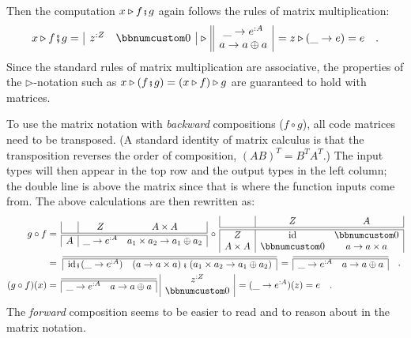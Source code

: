 Then the computation $x\triangleright f\bef g$ again follows the
rules of matrix multiplication:
\[
x\triangleright f\bef g=\,\begin{array}{|cc|}
z^{:Z} & \bbnum 0\end{array}\,\triangleright\,\begin{array}{||c|}
\_\rightarrow e^{:A}\\
a\rightarrow a\oplus a
\end{array}\,=z\triangleright(\_\rightarrow e)=e\quad.
\]
Since the standard rules of matrix multiplication are associative,
the properties of the $\triangleright$-notation such as $x\triangleright(f\bef g)=(x\triangleright f)\triangleright g$
are guaranteed to hold with matrices.

To use the matrix notation with \emph{backward} compositions ($f\circ g$),
all code matrices need to be transposed. (A standard identity of matrix
calculus is that the transposition reverses the order of composition,
$\left(AB\right)^{T}=B^{T}A^{T}$.) The input types will then appear
in the top row and the output types in the left column; the double
line is above the matrix since that is where the function inputs come
from. The above calculations are then rewritten as:
\begin{align*}
g\circ f & =\,\begin{array}{|c|cc|}
 & Z & A\times A\\
\hline\hline A & \_\rightarrow e^{:A} & a_{1}\times a_{2}\rightarrow a_{1}\oplus a_{2}
\end{array}\,\circ\,\begin{array}{|c|cc|}
 & Z & A\\
\hline\hline Z & \text{id} & \bbnum 0\\
A\times A & \bbnum 0 & a\rightarrow a\times a
\end{array}\\
 & =\,\,\begin{array}{|cc|}
\hline\hline \text{id}\bef(\_\rightarrow e^{:A}) & \left(a\rightarrow a\times a\right)\bef\left(a_{1}\times a_{2}\rightarrow a_{1}\oplus a_{2}\right)\end{array}\,=\,\begin{array}{|cc|}
\hline\hline \_\rightarrow e^{:A} & a\rightarrow a\oplus a\end{array}\quad.\\
(g\circ f)(x) & =\,\begin{array}{|cc|}
\hline\hline \_\rightarrow e^{:A} & a\rightarrow a\oplus a\end{array}\,\,\begin{array}{|c|}
z^{:Z}\\
\bbnum 0
\end{array}\,=(\_\rightarrow e^{:A})(z)=e\quad.
\end{align*}
The \emph{forward} composition seems to be easier to read and to reason
about in the matrix notation.

